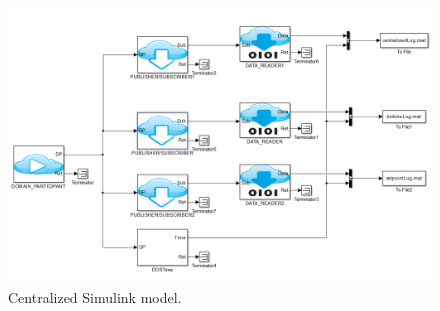 \begin{figure}[h]
\includegraphics[width=\textwidth]{figures/CentralizedModel}
	\caption[Centralized Simulink model]{
		\label{fig:centralizedSimulinkModel} 
		\footnotesize{%
			Centralized Simulink model.
		}
	}
\end{figure}